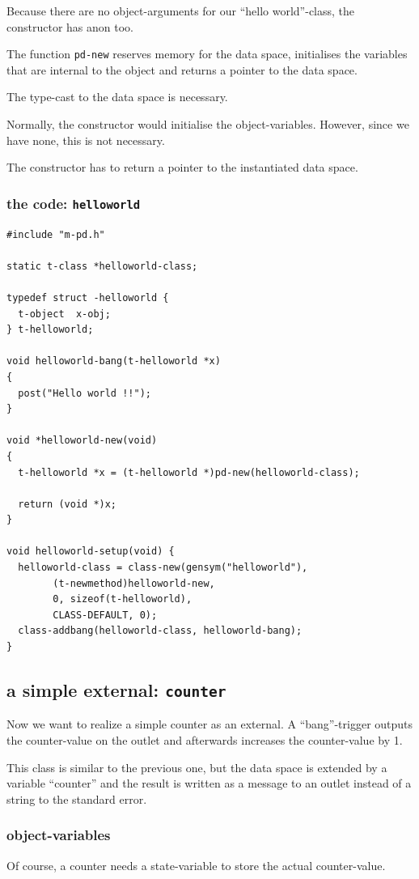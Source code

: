 \documentclass{ppgmus}
\begin{document}
Because there are no object-arguments for our ``hello world''-class,
the constructor has anon too.

The function \verb+pd-new+ reserves memory for the data space,
initialises the variables that are internal to the object and
returns a pointer to the data space.

The type-cast to the data space is necessary.

Normally, the constructor would initialise the object-variables.
However, since we have none, this is not necessary.


The constructor has to return a pointer to the instantiated data space.

\subsubsection{the code: \tt helloworld}

\begin{verbatim}
#include "m-pd.h"

static t-class *helloworld-class;

typedef struct -helloworld {
  t-object  x-obj;
} t-helloworld;

void helloworld-bang(t-helloworld *x)
{
  post("Hello world !!");
}

void *helloworld-new(void)
{
  t-helloworld *x = (t-helloworld *)pd-new(helloworld-class);

  return (void *)x;
}

void helloworld-setup(void) {
  helloworld-class = class-new(gensym("helloworld"),
        (t-newmethod)helloworld-new,
        0, sizeof(t-helloworld),
        CLASS-DEFAULT, 0);
  class-addbang(helloworld-class, helloworld-bang);
}
\end{verbatim}


\subsection{a simple external: {\tt counter}}

Now we want to realize a simple counter as an external.
A ``bang''-trigger outputs the counter-value on the outlet and
afterwards increases the counter-value by 1.

This class is similar to the previous one,
but the data space is extended by a variable ``counter'' and the
result is written as a message to an outlet instead of 
a string to the standard error.

\subsubsection{object-variables}
Of course, a counter needs a state-variable to store the actual counter-value.
\end{document}
